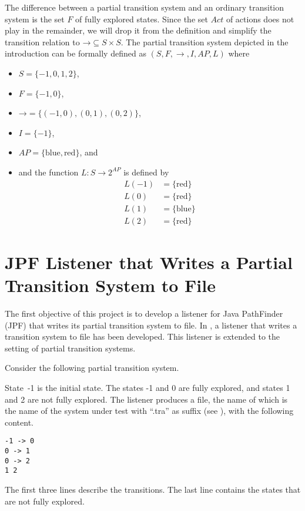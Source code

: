 \documentclass[12pt]{article}
\theoremstyle{definition}
\begin{document}
The difference between a partial transition system and an ordinary transition system is the set $F$ of fully explored states.  Since the set $\mathit{Act}$ of actions does not play in the remainder, we will drop it from the definition and simplify the transition relation to $\mathord{\rightarrow} \subseteq S \times S$. The partial transition system depicted in the introduction can be formally defined as $(S, F, \rightarrow, I, \mathit{AP}, L)$ where
\begin{itemize}
\item 
$S = \{ -1, 0, 1, 2 \}$,
\item
$F = \{ -1, 0 \}$,
\item
$\mathord{\rightarrow} = \{ (-1, 0), (0, 1), (0, 2) \}$,
\item
$I = \{ -1 \}$,
\item
$\mathit{AP} = \{ \mbox{blue}, \mbox{red} \}$, and
\item
and the function $L : S \to 2^{\mathit{AP}}$ is defined by
\begin{align*}
L(-1) & = \{ \mbox{red} \}\\
L(0) & = \{ \mbox{red} \}\\
L(1) & = \{ \mbox{blue} \}\\
L(2) & = \{ \mbox{red} \}
\end{align*}
\end{itemize} 

\section{JPF Listener that Writes a Partial Transition System to File}

The first objective of this project is to develop a listener for Java PathFinder (JPF) that writes its partial transition system to file.  In \cite[Section~7.3]{B20}, a listener that writes a transition system to file has been developed.  This listener is extended to the setting of partial transition systems.

Consider the following partial transition system.
\begin{center}
\end{center}
State~-1 is the initial state.  The states -1 and 0 are fully explored, and  states 1 and 2 are not fully explored.  The listener produces a file, the name of which is the name of the system under test with ``.tra'' as suffix (see \cite[Section 7.4]{B20}), with the following content.
\begin{verbatim}
-1 -> 0
0 -> 1
0 -> 2
1 2
\end{verbatim}
The first three lines describe the transitions.  The last line contains the states that are not fully explored.



\end{document}
